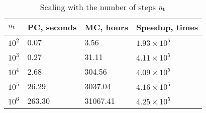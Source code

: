 \begin{table}[h]
  \vspace{-0.5em}
  \caption{Scaling with the number of steps \textnormal{${n_\text{t}}$}}
  \vspace{-0.5em}
  \begin{tabular*}{1\linewidth}{L{40pt}R{50pt}R{50pt}R{60pt}}
    \toprule
    ${n_\text{t}}$ & PC, seconds & MC, hours & Speedup, times \\
    \midrule
    \midrule
    $10^2$ &   0.07 &     3.56 & $1.93 \times 10^5$ \\
    $10^3$ &   0.27 &    31.11 & $4.11 \times 10^5$ \\
    $10^4$ &   2.68 &   304.56 & $4.09 \times 10^5$ \\
    $10^5$ &  26.29 &  3037.04 & $4.16 \times 10^5$ \\
    $10^6$ & 263.30 & 31067.41 & $4.25 \times 10^5$ \\
    \bottomrule
  \end{tabular*}
  \vspace{-0.5em}
\end{table}
